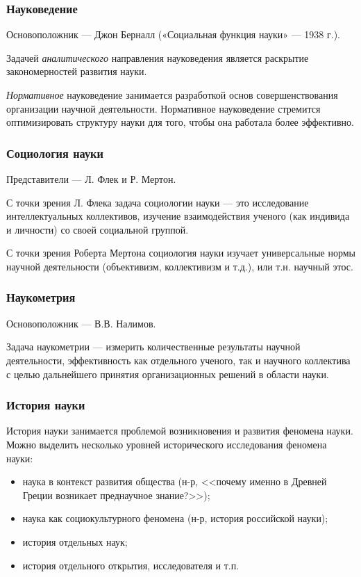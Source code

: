 \subsubsection{Науковедение}

Основоположник — Джон Берналл («Социальная функция науки» — 1938 г.).

Задачей \textit{аналитического} направления науковедения является раскрытие закономерностей развития науки. 

\textit{Нормативное} науковедение занимается разработкой основ совершенствования организации научной деятельности. Нормативное науковедение стремится оптимизировать структуру науки для того, чтобы она работала более эффективно. 

\subsubsection{Социология науки}

Представители — Л. Флек и Р. Мертон.

С точки зрения Л. Флека задача социологии науки — это исследование интеллектуальных коллективов, изучение взаимодействия ученого (как индивида и личности) со своей социальной группой.

С точки зрения Роберта Мертона социология науки изучает универсальные нормы научной деятельности (объективизм, коллективизм и т.д.), или т.н. научный этос. 


\subsubsection{Наукометрия}

Основоположник — В.В. Налимов.

Задача наукометрии — измерить количественные результаты научной деятельности, эффективность как отдельного ученого, так и научного коллектива с целью дальнейшего принятия организационных решений в области науки.

\subsubsection{История науки}

История науки занимается проблемой возникновения и развития феномена науки. Можно выделить несколько уровней исторического исследования феномена науки:
\begin{itemize}
    \item наука в контекст развития общества (н-р, <<почему именно в Древней Греции возникает преднаучное знание?>>);
    \item наука как социокультурного феномена (н-р, история российской науки);
    \item история отдельных наук;
    \item история отдельного открытия, исследователя и т.п.
\end{itemize}

